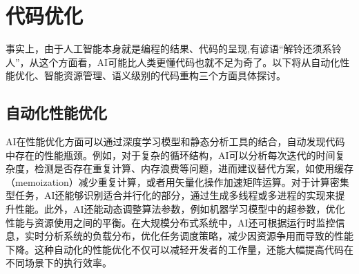 \documentclass[supercite]{HustGraduPaper}
\begin{document}
	\tableofcontents[pagenum=yes]
	
	\clearpage%
	
	\section{代码优化}
		事实上，由于人工智能本身就是编程的结果、代码的呈现,有谚语“解铃还须系铃人”，从这个方面看，AI可能比人类更懂代码也就不足为奇了。以下将从自动化性能优化、智能资源管理、语义级别的代码重构三个方面具体探讨。
	\subsection{自动化性能优化}
		AI在性能优化方面可以通过深度学习模型和静态分析工具的结合，自动发现代码中存在的性能瓶颈。例如，对于复杂的循环结构，AI可以分析每次迭代的时间复杂度，检测是否存在重复计算、内存浪费等问题，进而建议替代方案，如使用缓存（memoization）减少重复计算，或者用矢量化操作加速矩阵运算。对于计算密集型任务，AI还能够识别适合并行化的部分，通过生成多线程或多进程的实现来提升性能。此外，AI还能动态调整算法参数，例如机器学习模型中的超参数，优化性能与资源使用之间的平衡。在大规模分布式系统中，AI还可根据运行时监控信息，实时分析系统的负载分布，优化任务调度策略，减少因资源争用而导致的性能下降。这种自动化的性能优化不仅可以减轻开发者的工作量，还能大幅提高代码在不同场景下的执行效率。
\end{document}
